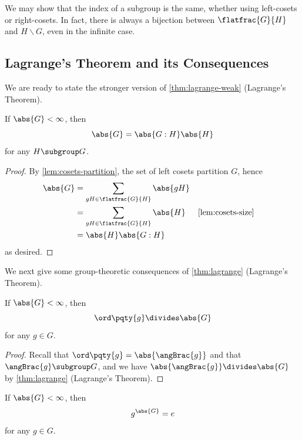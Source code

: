 We may show that the index of a subgroup is the same, whether using left-cosets or right-cosets. In fact, there is always a bijection between \(\flatfrac{G}{H}\) and \(H \backslash G\), even in the infinite case.

\subsection{Lagrange's Theorem and its Consequences}
\label{sec:lagrange-consequences}

We are ready to state the stronger version of \autoref{thm:lagrange-weak} (Lagrange's Theorem).

\begin{theorem}
    \label{thm:lagrange}%
    If \(\abs{G} < \infty\), then
    \[
        \abs{G} = \abs{G : H} \abs{H}
    \]
    for any \(H \subgroup G\).
\end{theorem}

\begin{proof}
    By \autoref{lem:cosets-partition}, the set of left cosets partition \(G\), hence
    \begin{align*}
        \abs{G} &= \sum_{gH \in \flatfrac{G}{H}} \abs{gH} \\
        &= \sum_{gH \in \flatfrac{G}{H}} \abs{H} && \text{\autoref{lem:cosets-size}} \\
        &= \abs{H} \abs{G : H}
    \end{align*}
    as desired.
\end{proof}

We next give some group-theoretic consequences of \autoref{thm:lagrange} (Lagrange's Theorem).

\begin{corollary}
    \label{cor:order-of-element-divides}%
    If \(\abs{G} < \infty\), then
    \[
        \ord\pqty{g} \divides \abs{G}
    \]
    for any \(g \in G\).
\end{corollary}

\begin{proof}
    Recall that \(\ord\pqty{g} = \abs{\angBrac{g}}\) and that \(\angBrac{g} \subgroup G\), and we have \(\abs{\angBrac{g}} \divides \abs{G}\) by \autoref{thm:lagrange} (Lagrange's Theorem).
\end{proof}

\begin{corollary}
    \label{cor:element-to-order}%
    If \(\abs{G} < \infty\), then
    \[
        g^{\abs{G}} = e
    \]
    for any \(g \in G\).
\end{corollary}

